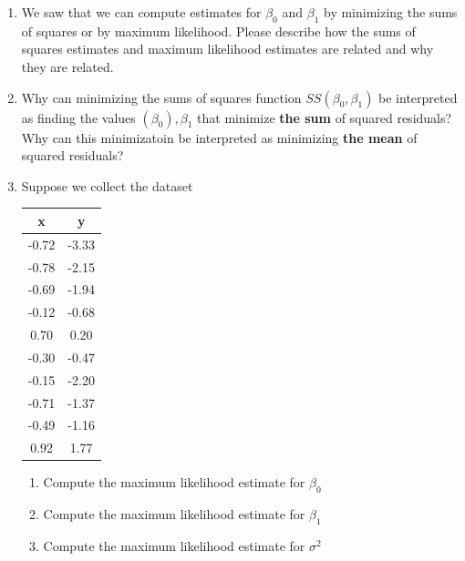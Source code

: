 \begin{enumerate}
\begin{enumerate}
    \end{enumerate}
    
    \item We saw that we can compute estimates for $\beta_{0}$ and $\beta_{1}$ by minimizing the sums of squares or by maximum likelihood. 
    Please describe how the sums of squares estimates and maximum likelihood estimates are related and why they are related.
    
    \item Why can minimizing the sums of squares function $SS(\beta_{0}, \beta_{1})$ be interpreted as finding the values $(\beta_{0}), \beta_{1}$ that minimize \textbf{the sum} of squared residuals? Why can this minimizatoin be interpreted as minimizing \textbf{the mean} of squared residuals?
    
    \item Suppose we collect the dataset
    \begin{table}[ht!]
        \centering
        \begin{tabular}{c|c}
            x & y \\
            \hline
            -0.72 &  -3.33\\
            -0.78 &  -2.15\\
            -0.69 &  -1.94\\
            -0.12 &  -0.68\\
             0.70 &  0.20\\
            -0.30 &  -0.47\\
            -0.15 &  -2.20\\
            -0.71 &  -1.37\\
            -0.49 &  -1.16\\
             0.92 &  1.77\\
        \end{tabular}
    \end{table}
    \begin{enumerate}
        \item Compute the maximum likelihood estimate for $\beta_{0}$
        \item Compute the maximum likelihood estimate for $\beta_{1}$
        \item Compute the maximum likelihood estimate for $\sigma^{2}$
    \end{enumerate}
    

\end{enumerate}
